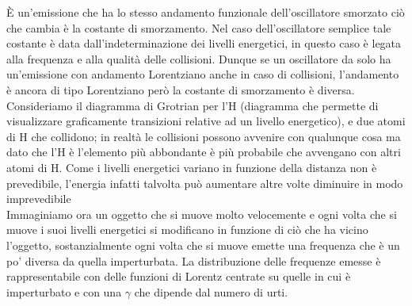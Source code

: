 \documentclass[a4paper,11pt]{article}
\begin{document}
È un’emissione che ha lo stesso andamento funzionale dell’oscillatore smorzato ciò che cambia è la costante di smorzamento. Nel caso dell’oscillatore semplice tale costante è data dall’indeterminazione dei livelli energetici, in questo caso è legata alla frequenza e alla qualità delle collisioni. Dunque se un oscillatore da solo ha un’emissione con andamento Lorentziano anche in caso di collisioni, l’andamento è ancora di tipo Lorentziano però la costante di smorzamento è diversa.\\
Consideriamo il diagramma di Grotrian per l’H (diagramma che permette di visualizzare graficamente transizioni relative ad un livello energetico), e due atomi di H che collidono; in realtà le collisioni possono avvenire con qualunque cosa ma dato che l’H è l’elemento più abbondante è più probabile che avvengano con altri atomi di H. Come i livelli energetici variano in funzione della distanza non è prevedibile, l’energia infatti talvolta può aumentare altre volte diminuire in modo imprevedibile\\
 Immaginiamo ora un oggetto che si muove molto velocemente e ogni volta che si muove i suoi livelli energetici si modificano in funzione di ciò che ha vicino l’oggetto, sostanzialmente ogni volta che si muove emette una frequenza che è un po’ diversa da quella imperturbata. La distribuzione delle frequenze emesse è rappresentabile con delle funzioni di Lorentz centrate su quelle in cui è imperturbato e con una \begin{math}\gamma \end{math} che dipende dal numero di urti.\\
\end{document}
